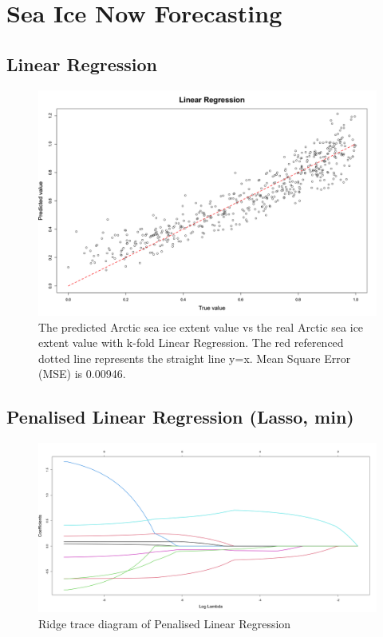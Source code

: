 \section{Sea Ice Now Forecasting} %

\subsection{Linear Regression} %


\begin{figure}[htbp]
\centering
\includegraphics[width = 1.0\textwidth]{Figure/4.2.1-LR.png}
\caption{The predicted Arctic sea ice extent value vs the real Arctic sea ice extent value with k-fold Linear Regression. The red referenced dotted line represents the straight line y=x. Mean Square Error (MSE) is 0.00946.}
\label{4.2.1-LR}
\end{figure}



\subsection{Penalised Linear Regression (Lasso, min)} %

\begin{figure}[htbp]
\centering
\includegraphics[width = 1.0\textwidth]{Figure/4.2.2-PLR-ridge-trance.png}
\caption{Ridge trace diagram of Penalised Linear Regression}
\label{4.2.2-PLR-ridge-trance}
\end{figure}

